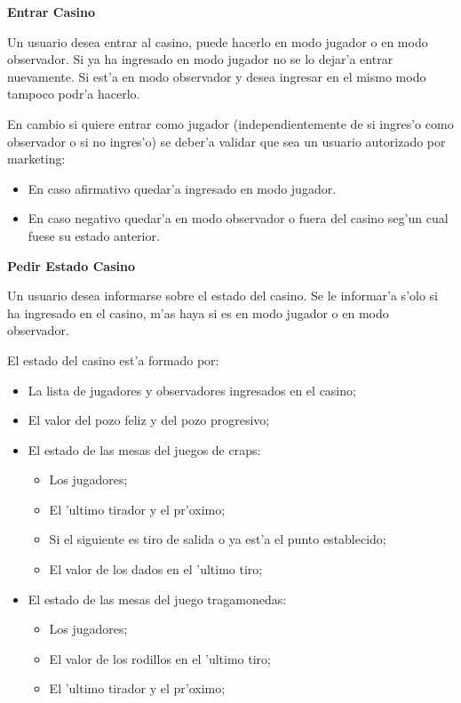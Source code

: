 
\textbf{Entrar Casino}

Un usuario desea entrar al casino, puede hacerlo en modo jugador o en modo observador.
Si ya ha ingresado en modo jugador no se lo dejar'a entrar nuevamente. Si est'a en modo observador y desea ingresar en el mismo modo tampoco podr'a hacerlo.

En cambio si quiere entrar como jugador (independientemente de si ingres'o como observador o si no ingres'o) se deber'a validar que sea un usuario autorizado por marketing:

\begin{itemize}
 \item En caso afirmativo quedar'a ingresado en modo jugador.
 \item En caso negativo quedar'a en modo observador o fuera del casino seg'un cual fuese su estado anterior.
\end{itemize}



\clearpage

\textbf{Pedir Estado Casino}

Un usuario desea informarse sobre el estado del casino. Se le informar'a s'olo si ha ingresado en el casino, m'as haya si es en modo jugador o en modo observador.

El estado del casino est'a formado por:

\begin{itemize}
 \item La lista de jugadores y observadores ingresados en el casino;
 \item El valor del pozo feliz y del pozo progresivo;
 \item El estado de las mesas del juegos de craps:
	\begin{itemize}
	 \item Los jugadores;
	 \item El 'ultimo tirador y el pr'oximo;
	 \item Si el siguiente es tiro de salida o ya est'a el punto establecido;
	 \item El valor de los dados en el 'ultimo tiro;
	\end{itemize}
 \item El estado de las mesas del juego tragamonedas:
	\begin{itemize}
 	 \item Los jugadores;
 	 \item El valor de los rodillos en el 'ultimo tiro;
 	 \item El 'ultimo tirador y el pr'oximo;
	\end{itemize}
\end{itemize}


